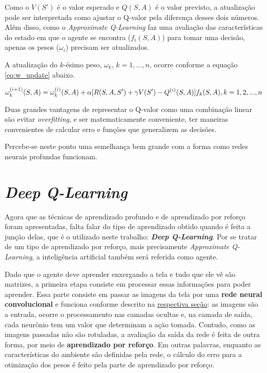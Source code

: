 Como o $V(S')$ é o valor esperado e $Q(S,A)$ é o valor previsto, a atualização pode ser interpretada como ajustar o Q-valor pela diferença desses dois números.
Além disso, como o \textit{Approximate Q-Learning} faz uma avaliação das características do estado em que o agente se encontra ($f_{i}(S,A)$) para tomar uma decisão, apenas os pesos ($\omega_{i}$) precisam ser atualizados.

A atualização do $k$-ésimo peso, $\omega_{k}$, $k = 1, ..., n$, ocorre conforme a equação \ref{eq:w_update} abaixo.

\begin{equation} \label{eq:w_update}
\omega_{k}^{(i+1)}(S,A) = \omega_{k}^{(i)}(S,A) + \alpha[R(S,A,S') + \gamma V(S') - Q^{(i)}(S,A)]f_{k}(S,A), \hfill k = 1, 2, ..., n
\end{equation}

Duas grandes vantagens de representar o Q-valor como uma combinação linear são evitar \textit{overfitting}, e ser matematicamente conveniente, ter maneiras convenientes de calcular erro e funções que generalizem as decisões.

Percebe-se neste ponto uma semelhança bem grande com a forma como redes neurais profundas funcionam.


\section{\textit{Deep Q-Learning}}
\label{sec:dql}

Agora que as técnicas de aprendizado profundo e de aprendizado por reforço foram apresentadas, falta falar do tipo de aprendizado obtido quando é feita a junção delas, que é o utilizado neste trabalho: \textit{\textbf{Deep Q-Learning}}.
Por se tratar de um tipo de aprendizado por reforço, mais precisamente \textit{Approximate Q-Learning}, a inteligência artificial também será referida como agente.

Dado que o agente deve aprender enxergando a tela e tudo que ele vê são matrizes, a primeira etapa consiste em processar essas informações para poder aprender.
Essa parte consiste em passar as imagens da tela por uma \textbf{rede neural convolucional} e funciona conforme descrito na \hyperref[sec:cnn]{respectiva seção}: as imagens são a entrada, ocorre o processamento nas camadas ocultas e, na camada de saída, cada neurônio tem um valor que determinam a ação tomada.
Contudo, como as imagens passadas não são rotuladas, a avaliação da saída da rede é feita de outra forma, por meio de \textbf{aprendizado por reforço}.
Em outras palavras, enquanto as características do ambiente são definidas pela rede, o cálculo do erro para a otimização dos pesos é feito pela parte de aprendizado por reforço.

